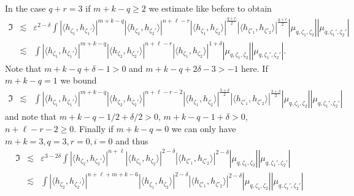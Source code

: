 In the case $q + r = 3$ if $m + k - q \geqslant 2$ we estimate like before to
obtain
\begin{eqnarray}
  \mathfrak{I} & \lesssim & \varepsilon^{2 - \delta} \int | \langle
  h_{\zeta_1}, h_{\zeta_1'} \rangle |^{m + k - q} | \langle h_{\zeta_2},
  h_{\zeta_2'} \rangle |^{n + \ell - r} | \langle h_{\zeta_1}, h_{\zeta_2}
  \rangle |^{\frac{q + r}{2}} | \langle h_{\zeta'_1}, h_{\zeta'_2} \rangle
  |^{\frac{q + r}{2}} | \mu_{q, \zeta_1, \zeta_2} | | \mu_{q, \zeta_1',
  \zeta_2'} | \nonumber\\
  & \lesssim & \int | \langle h_{\zeta_1}, h_{\zeta_1'} \rangle |^{m + k - q}
  | \langle h_{\zeta_2}, h_{\zeta_2'} \rangle |^{n + \ell - r} | \langle
  h_{\zeta_1}, h_{\zeta_2} \rangle |^{1 + \delta} | \mu_{q, \zeta_1, \zeta_2}
  | | \mu_{q, \zeta_1', \zeta_2'} | .  \label{e:graph-est-2}
\end{eqnarray}
Note that $m + k - q + \delta - 1 > 0$ and $m + k - q + 2 \delta - 3 > - 1$
here. If $m + k - q = 1$ we bound
\begin{eqnarray}
  \mathfrak{I} & \lesssim & \int | \langle h_{\zeta_1}, h_{\zeta_1'} \rangle
  |^{m + k - q} | \langle h_{\zeta_2}, h_{\zeta_2'} \rangle |^{n + \ell - r -
  2} | \langle h_{\zeta_1}, h_{\zeta_2} \rangle |^{\frac{3 + \delta}{2}} |
  \langle h_{\zeta'_1}, h_{\zeta'_2} \rangle |^{\frac{3 + \delta}{2}} |
  \mu_{q, \zeta_1, \zeta_2} | | \mu_{q, \zeta_1', \zeta_2'} | 
  \label{e:graph-est-3}
\end{eqnarray}
and note that $m + k - q - 1 / 2 + \delta / 2 > 0$, $m + k - q - 1 + \delta >
0$, $n + \ell - r - 2 \geqslant 0$. Finally if $m + k - q = 0$ we can only
have $m + k = 3, q = 3, r = 0, i = 0$ and thus
\begin{eqnarray}
  \mathfrak{I} & \lesssim & \varepsilon^{3 - 2 \delta} \int | \langle
  h_{\zeta_2}, h_{\zeta_2'} \rangle |^{n + \ell} | \langle h_{\zeta_1},
  h_{\zeta_2} \rangle |^{2 - \delta} | \langle h_{\zeta'_1}, h_{\zeta'_2}
  \rangle |^{2 - \delta} | \mu_{q, \zeta_1, \zeta_2} | | \mu_{q, \zeta_1',
  \zeta_2'} | \nonumber\\
  & \lesssim & \int | \langle h_{\zeta_2}, h_{\zeta_2'} \rangle |^{n + \ell +
  m + k - 6} | \langle h_{\zeta_1}, h_{\zeta_2} \rangle |^{2 - \delta} |
  \langle h_{\zeta'_1}, h_{\zeta'_2} \rangle |^{2 - \delta} | \mu_{q, \zeta_1,
  \zeta_2} | | \mu_{q, \zeta_1', \zeta_2'} |  \label{e:graph-est-4}
\end{eqnarray}


